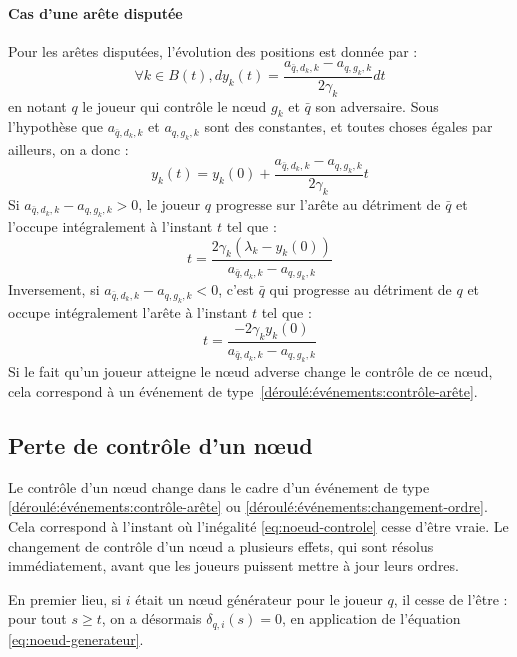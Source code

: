 \documentclass[a4paper,11pt,headings=normal]{scrartcl}
\theoremstyle{mythm}
\begin{document}
\paragraph{Cas d'une arête disputée} Pour les arêtes disputées, l'évolution
des positions est donnée par :
\begin{equation}
  \forall k \in B(t), dy_k(t) = \frac{a_{{\bar q},d_k,k} - a_{q,g_k,k}}{2 \gamma_k} dt
\end{equation}
en notant $q$ le joueur qui contrôle le nœud $g_k$ et $\bar q$ son
adversaire. Sous l'hypothèse que $a_{{\bar q},d_k,k}$ et $a_{q,g_k,k}$
sont des constantes, et toutes choses égales par ailleurs, on a donc :
\begin{equation}
  y_k(t) = y_k(0) + \frac{a_{{\bar q},d_k,k} - a_{q,g_k,k}}{2 \gamma_k} t
\end{equation}
Si $a_{{\bar q},d_k,k} - a_{q,g_k,k} > 0$, le joueur $q$ progresse sur
l'arête au détriment de $\bar q$ et l'occupe intégralement à l'instant
$t$ tel que :
\begin{equation}
  t = \frac{2 \gamma_k \left( \lambda_k - y_k(0) \right)}{a_{{\bar q},d_k,k} - a_{q,g_k,k}}
\end{equation}
Inversement, si $a_{{\bar q},d_k,k} - a_{q,g_k,k} < 0$, c'est $\bar q$
qui progresse au détriment de $q$ et occupe intégralement l'arête à
l'instant $t$ tel que :
\begin{equation}
  t = \frac{-2 \gamma_k y_k(0)}{a_{{\bar q},d_k,k} - a_{q,g_k,k}}
\end{equation}
Si le fait qu'un joueur atteigne le nœud adverse change le contrôle de
ce nœud, cela correspond à un événement de
type~\ref{déroulé:événements:contrôle-arête}.

\subsection{Perte de contrôle d'un nœud}
\label{déroulé:perte-nœud}

Le contrôle d'un nœud change dans le cadre d'un événement de type
\ref{déroulé:événements:contrôle-arête} ou
\ref{déroulé:événements:changement-ordre}. Cela correspond à l'instant
où l'inégalité \eqref{eq:noeud-controle} cesse d'être vraie. Le
changement de contrôle d'un nœud a plusieurs effets, qui sont résolus
immédiatement, avant que les joueurs puissent mettre à jour leurs
ordres.

En premier lieu, si $i$ était un nœud générateur pour le joueur $q$,
il cesse de l'être : pour tout $s \geq t$, on a désormais
$\delta_{q,i}(s) = 0$, en application de l'équation
\eqref{eq:noeud-generateur}.
\end{document}
